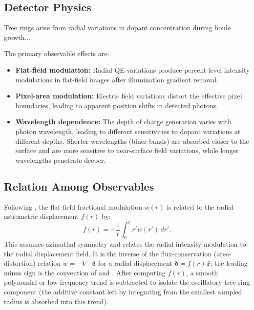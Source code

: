 \subsection{Detector Physics}

Tree rings arise from radial variations in dopant concentration during boule growth... 


The primary observable effects are:

\begin{itemize}
\item \textbf{Flat-field modulation:} Radial QE variations produce percent-level intensity modulations in flat-field images after illumination gradient removal.
\item \textbf{Pixel-area modulation:} Electric field variations distort the effective pixel boundaries, leading to apparent position shifts in detected photons.
\item \textbf{Wavelength dependence:} The depth of charge generation varies with photon wavelength, leading to different sensitivities to dopant variations at different depths. Shorter wavelengths (bluer bands) are absorbed closer to the surface and are more sensitive to near-surface field variations, while longer wavelengths penetrate deeper.
\end{itemize}

\subsection{Relation Among Observables}

Following \citet{Plazas2014}, the flat-field fractional modulation $w(r)$ is related to the radial astrometric displacement $f(r)$ by:
%
\begin{equation}
f(r) = -\frac{1}{r} \int_0^r r' w(r') \, dr'.
\label{eq:displacement}
\end{equation}
%
This assumes azimuthal symmetry and relates the radial intensity modulation to the radial displacement field. It is the inverse of the flux-conservation (area-distortion) relation $w = -\nabla\!\cdot\!\boldsymbol{\delta}$ for a radial displacement $\boldsymbol{\delta}=f(r)\,\hat{\mathbf r}$; the leading minus sign is the convention of \citet{Plazas2014} and \citet{Esteves2023}. After computing $f(r)$, a smooth polynomial or low-frequency trend is subtracted to isolate the oscillatory tree-ring component (the additive constant left by integrating from the smallest sampled radius is absorbed into this trend).

